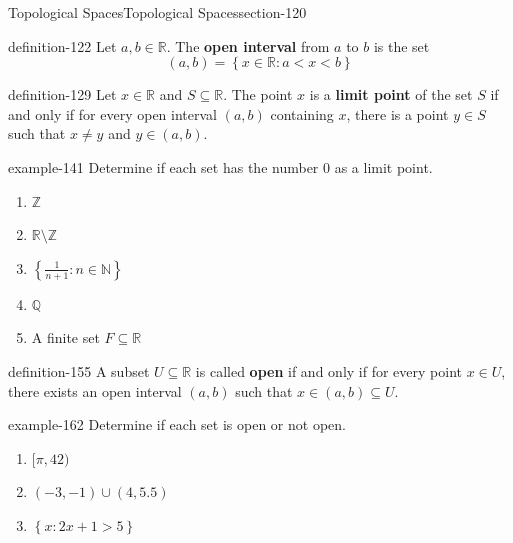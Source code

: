 \documentclass[oneside,10pt,]{article}
\newcommand{\terminology}[1]{\textbf{#1}}
\newcommand{\mb}{\mathbb}
\newcommand{\setBuilder}[2]{\left\{#1:#2\right\}}
\newcommand{\lt}{<}
\begin{document}
%
%
\typeout{************************************************}
\typeout{************************************************}
%
\begin{sectionptx}{Topological Spaces}{}{Topological Spaces}{}{}{section-120}
\begin{definition}{}{definition-122}%
\hypertarget{p-123}{}%
Let \(a,b\in\mb R\). The \terminology{open interval} from \(a\) to \(b\) is the set%
%
\begin{equation*}
(a,b)=\setBuilder{x\in\mb R}{a\lt x\lt b}
\end{equation*}
\end{definition}
\begin{definition}{}{definition-129}%
\hypertarget{p-130}{}%
Let \(x\in\mb R\) and \(S\subseteq\mb R\). The point \(x\) is a \terminology{limit point} of the set \(S\) if and only if for every open interval \((a,b)\) containing \(x\), there is a point \(y\in S\) such that \(x\not=y\) and \(y\in(a,b)\).%
\end{definition}
\begin{example}{}{example-141}%
\hypertarget{p-142}{}%
Determine if each set has the number \(0\) as a limit point.%
\leavevmode%
\begin{enumerate}
\item\hypertarget{li-145}{}\(\mb Z\)%
\item\hypertarget{li-147}{}\(\mb R\setminus\mb Z\)%
\item\hypertarget{li-149}{}\(\setBuilder{\frac{1}{n+1}}{n\in\mb N}\)%
\item\hypertarget{li-151}{}\(\mb Q\)%
\item\hypertarget{li-153}{}A finite set \(F\subseteq\mb R\)%
\end{enumerate}
\end{example}
\begin{definition}{}{definition-155}%
\hypertarget{p-156}{}%
A subset \(U\subseteq\mb R\) is called \terminology{open} if and only if for every point \(x\in U\), there exists an open interval \((a,b)\) such that \(x\in(a,b)\subseteq U\).%
\end{definition}
\begin{example}{}{example-162}%
\hypertarget{p-163}{}%
Determine if each set is open or not open.%
\leavevmode%
\begin{enumerate}
\item\hypertarget{li-165}{}\([\pi,42)\)%
\item\hypertarget{li-167}{}\((-3,-1)\cup(4,5.5)\)%
\item\hypertarget{li-169}{}\(\setBuilder{x}{2x+1>5}\)%

\end{enumerate}
\end{example}
\end{sectionptx}
\end{document}
